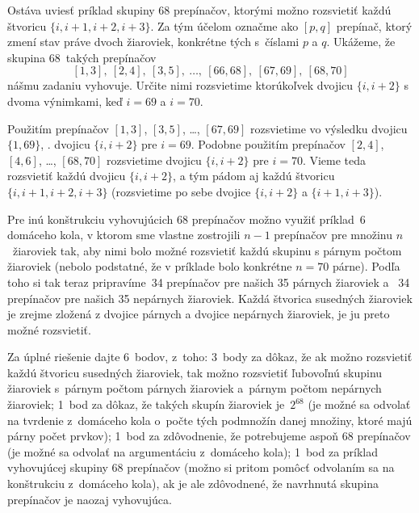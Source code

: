 {Ostáva uviesť príklad skupiny 68 prepínačov, ktorými
možno rozsvietiť každú štvoricu $\{i, i+1, i+2, i+3\}$.
Za tým účelom označme ako $[p,q]$ prepínač, ktorý zmení
stav práve dvoch žiaroviek, konkrétne tých s~číslami $p$ a $q$.
Ukážeme, že skupina 68~takých prepínačov
$$
[1, 3],\ [2, 4],\ [3, 5],\ \ldots,\
[66, 68],\ [67, 69],\ [68, 70]
$$
nášmu zadaniu vyhovuje. Určite nimi rozsvietime
ktorúkoľvek dvojicu $\{i,i+2\}$ s dvoma výnimkami, keď $i=69$ a
$i=70$.

Použitím prepínačov
$[1, 3]$, $[3, 5]$, \dots, $[67, 69]$
rozsvietime vo výsledku dvojicu $\{1, 69\}$, \tj. dvojicu
$\{i,i+2\}$ pre $i=69$. Podobne použitím prepínačov
$[2,4]$, $[4, 6]$, \dots, $[68, 70]$
rozsvietime dvojicu $\{i,i+2\}$ pre $i=70$. Vieme teda rozsvietiť
každú dvojicu $\{i,i+2\}$, a tým pádom aj každú štvoricu
$\{i, i+1, i+2, i+3\}$ (rozsvietime po sebe dvojice $\{i,i+2\}$ a
$\{i+1,i+3\}$).

\Pozn
Pre inú konštrukciu vyhovujúcich 68 prepínačov možno
využiť príklad~6 domáceho kola, v ktorom sme vlastne
zostrojili $n-1$ prepínačov pre množinu $n$~žiaroviek tak,
aby nimi bolo možné rozsvietiť každú skupinu s párnym počtom žiaroviek
(nebolo podstatné, že v príklade bolo konkrétne $n=70$ párne). Podľa
toho si tak teraz pripravíme~34 prepínačov pre našich 35 párnych
žiaroviek a ~34 prepínačov pre našich 35 nepárnych žiaroviek. Každá
štvorica susedných žiaroviek je zrejme zložená z dvojice párnych a
dvojice nepárnych žiaroviek, je ju preto možné rozsvietiť.

\schemaABC
Za úplné riešenie dajte 6~bodov, z~toho: 3~body za dôkaz,
že ak možno rozsvietiť každú štvoricu susedných
žiaroviek, tak možno rozsvietiť ľubovoľnú skupinu žiaroviek
s~párnym počtom párnych žiaroviek a~párnym počtom nepárnych žiaroviek;
1~bod za dôkaz, že takých skupín žiaroviek je~$2^{68}$ (je možné
sa odvolať na tvrdenie z~domáceho kola o~počte
tých podmnožín danej množiny, ktoré majú párny počet prvkov);
1~bod za zdôvodnenie, že potrebujeme aspoň 68 prepínačov (je možné
sa odvolať na argumentáciu z~domáceho kola); 1~bod za
príklad vyhovujúcej skupiny 68 prepínačov (možno si pritom pomôcť
odvolaním sa na konštrukciu z~domáceho kola), ak je ale zdôvodnené, že navrhnutá skupina prepínačov je naozaj vyhovujúca.
\endschema
}

